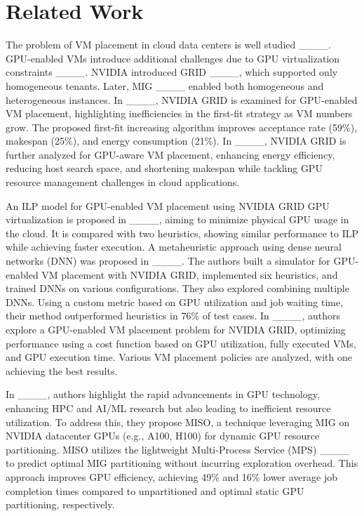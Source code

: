 \section{Related Work}
\label{s:related-work}
	
	The problem of VM placement in cloud data centers is well studied ____. GPU-enabled VMs introduce additional challenges due to GPU virtualization constraints ____. NVIDIA introduced GRID ____, which supported only homogeneous tenants. Later, MIG ____ enabled both homogeneous and heterogeneous instances. In ____, NVIDIA GRID is examined for GPU-enabled VM placement, highlighting inefficiencies in the first-fit strategy as VM numbers grow. The proposed first-fit increasing algorithm improves acceptance rate (59\%), makespan (25\%), and energy consumption (21\%). In ____, NVIDIA GRID is further analyzed for GPU-aware VM placement, enhancing energy efficiency, reducing host search space, and shortening makespan while tackling GPU resource management challenges in cloud applications.
	
	An ILP model for GPU-enabled VM placement using NVIDIA GRID GPU virtualization is proposed in ____, aiming to minimize physical GPU usage in the cloud. It is compared with two heuristics, showing similar performance to ILP while achieving faster execution. A metaheuristic approach using dense neural networks (DNN) was proposed in ____. The authors built a simulator for GPU-enabled VM placement with NVIDIA GRID, implemented six heuristics, and trained DNNs on various configurations. They also explored combining multiple DNNs. Using a custom metric based on GPU utilization and job waiting time, their method outperformed heuristics in 76\% of test cases. In ____, authors explore a GPU-enabled VM placement problem for NVIDIA GRID, optimizing performance using a cost function based on GPU utilization, fully executed VMs, and GPU execution time. Various VM placement policies are analyzed, with one achieving the best results. 
	
	In ____, authors highlight the rapid advancements in GPU technology, enhancing HPC and AI/ML research but also leading to inefficient resource utilization. To address this, they propose MISO, a technique leveraging MIG on NVIDIA datacenter GPUs (e.g., A100, H100) for dynamic GPU resource partitioning. MISO utilizes the lightweight Multi-Process Service (MPS) ____ to predict optimal MIG partitioning without incurring exploration overhead. This approach improves GPU efficiency, achieving 49\% and 16\% lower average job completion times compared to unpartitioned and optimal static GPU partitioning, respectively.
	
